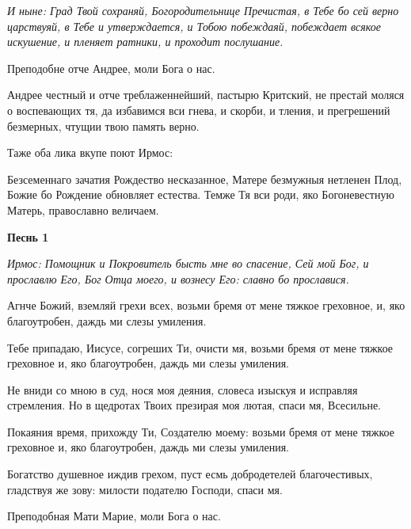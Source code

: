 \itshape И ныне\normalfont{}: Град Твой сохраняй, Богородительнице Пречистая, в Тебе бо сей верно царствуяй, в Тебе и утверждается, и Тобою побеждаяй, побеждает всякое искушение, и пленяет ратники, и проходит послушание. 

\bfseries 

Преподобне отче Андрее, моли Бога о нас.\normalfont{}

Андрее честный и отче треблаженнейший, пастырю Критский, не престай моляся о воспевающих тя, да избавимся вси гнева, и скорби, и тления, и прегрешений безмерных, чтущии твою память верно. 

\itshape 

Таже оба лика вкупе поют Ирмос\normalfont{}:

Безсеменнаго зачатия Рождество несказанное, Матере безмужныя нетленен Плод, Божие бо Рождение обновляет естества. Темже Тя вси роди, яко Богоневестную Матерь, православно величаем.

 



\mychapterending

 


\bfseries Песнь 1\normalfont{}

\itshape Ирмос\normalfont{}: Помощник и Покровитель бысть мне во спасение, Сей мой Бог, и прославлю Его, Бог Отца моего, и вознесу Его: славно бо прославися. 

Агнче Божий, вземляй грехи всех, возьми бремя от мене тяжкое греховное, и, яко благоутробен, даждь ми слезы умиления. 

Тебе припадаю, Иисусе, согреших Ти, очисти мя, возьми бремя от мене тяжкое греховное и, яко благоутробен, даждь ми слезы умиления. 

Не вниди со мною в суд, нося моя деяния, словеса изыскуя и исправляя стремления. Но в щедротах Твоих презирая моя лютая, спаси мя, Всесильне. 

Покаяния время, прихожду Ти, Создателю моему: возьми бремя от мене тяжкое греховное и, яко благоутробен, даждь ми слезы умиления. 

Богатство душевное иждив грехом, пуст есмь добродетелей благочестивых, гладствуя же зову: милости подателю Господи, спаси мя. 

\bfseries 

Преподобная Мати Марие, моли Бога о нас.

\normalfont{}

